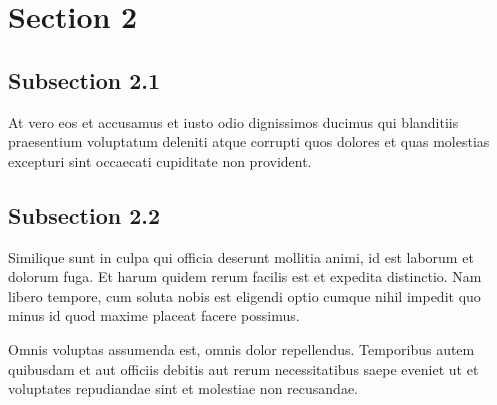 \section{Section 2}

\subsection{Subsection 2.1}

At vero eos et accusamus et iusto odio dignissimos ducimus qui blanditiis praesentium voluptatum deleniti atque corrupti quos dolores et quas molestias excepturi sint occaecati cupiditate non provident.

\subsection{Subsection 2.2}

Similique sunt in culpa qui officia deserunt mollitia animi, id est laborum et dolorum fuga. Et harum quidem rerum facilis est et expedita distinctio. Nam libero tempore, cum soluta nobis est eligendi optio cumque nihil impedit quo minus id quod maxime placeat facere possimus.

Omnis voluptas assumenda est, omnis dolor repellendus. Temporibus autem quibusdam et aut officiis debitis aut rerum necessitatibus saepe eveniet ut et voluptates repudiandae sint et molestiae non recusandae.

